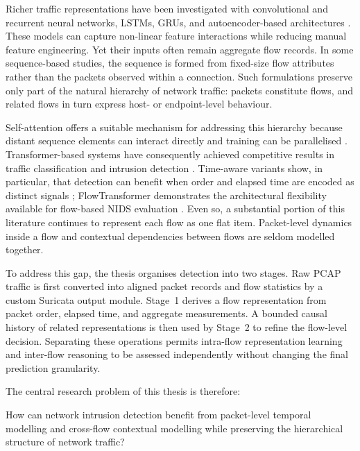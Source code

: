 \documentclass[11pt,fleqn]{report}
\begin{document}
Richer traffic representations have been investigated with convolutional and recurrent neural networks, LSTMs, GRUs, and autoencoder-based architectures \cite{Yin2017RNNIDS,Shone2018NNAE,Mirsky2018Kitsune}. These models can capture non-linear feature interactions while reducing manual feature engineering. Yet their inputs often remain aggregate flow records. In some sequence-based studies, the sequence is formed from fixed-size flow attributes rather than the packets observed within a connection. Such formulations preserve only part of the natural hierarchy of network traffic: packets constitute flows, and related flows in turn express host- or endpoint-level behaviour.

Self-attention offers a suitable mechanism for addressing this hierarchy because distant sequence elements can interact directly and training can be parallelised \cite{Vaswani2017}. Transformer-based systems have consequently achieved competitive results in traffic classification and intrusion detection \cite{Wu2022RTIDS,Han2023GTID,Manocchio2024FlowTransformer}. Time-aware variants show, in particular, that detection can benefit when order and elapsed time are encoded as distinct signals \cite{Han2023GTID}; FlowTransformer demonstrates the architectural flexibility available for flow-based NIDS evaluation \cite{Manocchio2024FlowTransformer}. Even so, a substantial portion of this literature continues to represent each flow as one flat item. Packet-level dynamics inside a flow and contextual dependencies between flows are seldom modelled together.

To address this gap, the thesis organises detection into two stages. Raw PCAP traffic is first converted into aligned packet records and flow statistics by a custom Suricata output module. Stage~1 derives a flow representation from packet order, elapsed time, and aggregate measurements. A bounded causal history of related representations is then used by Stage~2 to refine the flow-level decision. Separating these operations permits intra-flow representation learning and inter-flow reasoning to be assessed independently without changing the final prediction granularity.

The central research problem of this thesis is therefore:

\begin{displayquote}
How can network intrusion detection benefit from packet-level temporal modelling and cross-flow contextual modelling while preserving the hierarchical structure of network traffic?
\end{displayquote}
\end{document}
